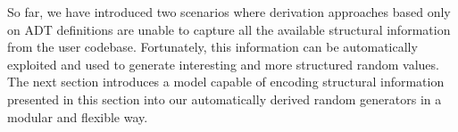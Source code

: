 






So far, we have introduced two scenarios where derivation approaches based only
on ADT definitions are unable to capture all the available structural
information from the user codebase.
%
Fortunately, this information can be automatically exploited and used to
generate interesting and more structured random values.
%
The next section introduces a model capable of encoding structural information
presented in this section into our automatically derived random generators in a
modular and flexible way.







